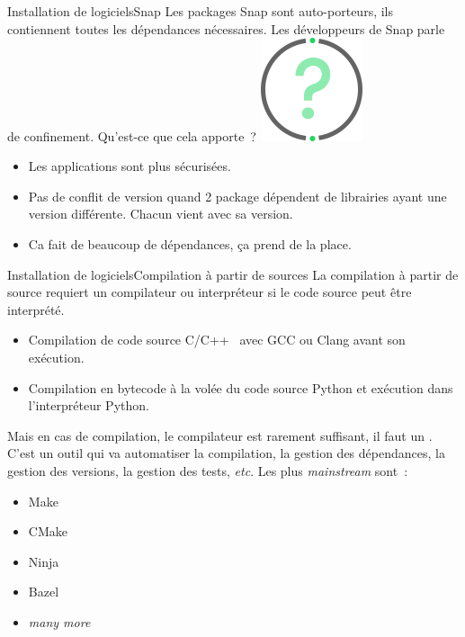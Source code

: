 \documentclass{beamer}
\begin{document}
    \begin{frame}{Installation de logiciels}{Snap}
        Les packages Snap sont auto-porteurs, ils contiennent toutes les dépendances nécessaires.
        Les développeurs de Snap parle de confinement.
        \bigbreak
        Qu'est-ce que cela apporte~?
        \bigbreak
        \centering
        \includegraphics[width=3cm]{image/question-mark}
        \pause
        \begin{itemize}
            \item Les applications sont plus sécurisées.
            \item Pas de conflit de version quand 2 package dépendent de librairies ayant une version différente.
            Chacun vient avec sa version.
            \item Ca fait de beaucoup de dépendances, ça prend de la place.
        \end{itemize}
    \end{frame}

    \begin{frame}{Installation de logiciels}{Compilation à partir de sources}
        La compilation à partir de source requiert un compilateur ou interpréteur si le code source peut être interprété.
        \bigbreak
        \begin{itemize}
            \item Compilation de code source C/C++~ avec GCC ou Clang avant son exécution.
            \item Compilation en bytecode à la volée du code source Python et exécution dans l'interpréteur Python.
        \end{itemize}
        Mais en cas de compilation, le compilateur est rarement suffisant, il faut un .
        C'est un outil qui va automatiser la compilation, la gestion des dépendances, la gestion des versions, la gestion des tests, \textit{etc}.
        Les plus \textit{mainstream} sont~:
        \begin{itemize}
            \item Make
            \item CMake
            \item Ninja
            \item Bazel
            \item \textit{many more}
        \end{itemize}
    \end{frame}
\end{document}
